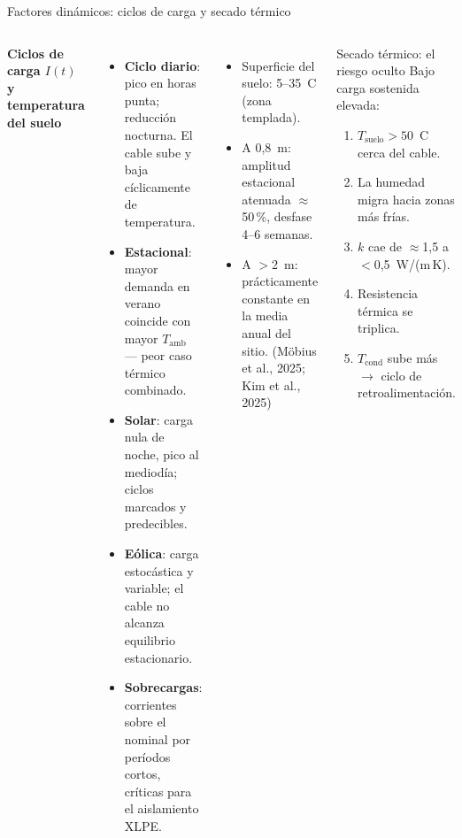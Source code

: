 \documentclass[aspectratio=169]{beamer}
\newcommand{\refcite}[1]{{\footnotesize\color{gray!70!black} #1}}
\begin{document}
\begin{frame}{Factores dinámicos: ciclos de carga y secado térmico}
\begin{columns}[T]
\textbf{\small Ciclos de carga $I(t)$ y temperatura del suelo}
\begin{itemize}[leftmargin=*]\scriptsize
    \item \textbf{Ciclo diario}: pico en horas punta; reducción nocturna.
          El cable sube y baja cíclicamente de temperatura.
    \item \textbf{Estacional}: mayor demanda en verano coincide con mayor
          $T_\text{amb}$ --- peor caso térmico combinado.
    \item \textbf{Solar}: carga nula de noche, pico al mediodía; ciclos
          marcados y predecibles.
    \item \textbf{Eólica}: carga estocástica y variable; el cable no
          alcanza equilibrio estacionario.
    \item \textbf{Sobrecargas}: corrientes sobre el nominal por períodos
          cortos, críticas para el aislamiento XLPE.
\end{itemize}
\vspace{0.2em}
\begin{itemize}[leftmargin=*]\scriptsize
    \item Superficie del suelo: 5--35~\textdegree{}C (zona templada).
    \item A 0{,}8~m: amplitud estacional atenuada $\approx$50\,\%,
          desfase 4--6 semanas.
    \item A $>$2~m: prácticamente constante en la media anual del sitio.
    \refcite{(Möbius et al., 2025; Kim et al., 2025)}
\end{itemize}
\begin{alertblock}{\small Secado térmico: el riesgo oculto}
\scriptsize
Bajo carga sostenida elevada:
\begin{enumerate}[leftmargin=*,itemsep=0pt]
    \item $T_\text{suelo}>50$~\textdegree{}C cerca del cable.
    \item La humedad migra hacia zonas más frías.
    \item $k$ cae de $\approx$1{,}5 a $<$0{,}5~W/(m\,K).
    \item Resistencia térmica se triplica.
    \item $T_\text{cond}$ sube más $\to$ ciclo de retroalimentación.

\end{enumerate}
\end{alertblock}
\end{columns}
\end{frame}
\end{document}
